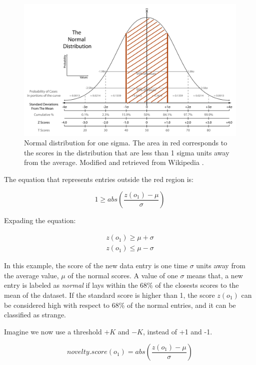 \begin{figure}[h]
\includegraphics[width=15cm]{Figures/Normal_d_sigma}
\centering
\caption[Normal distribution for one sigma]{Normal distribution for one sigma. The area in red corresponds to the scores in the distribution that are less than 1 sigma units away from the average. Modified and retrieved from Wikipedia \cite{standard}. \label{fig:normal_sig}}
\end{figure}

The equation that represents entries outside the red region is:

\begin{equation}
1 \geq abs( \dfrac{z(o_1) - \mu}{ \sigma} )
\end{equation}

Expading the equation:

\begin{equation}
\begin{split}
z(o_1) \geq \mu +\sigma \\
z(o_1) \leq \mu -\sigma
\end{split}
\end{equation}

In this example, the score of the new data entry is one time $\sigma$ units away from the average value, $\mu$ of the normal scores. A value of one $\sigma$ means that, a new entry is labeled as \emph{normal} if lays within the 68\% of the closests scores to the mean of the dataset. If the standard score is higher than 1, the score $z(o_1)$ can be considered high with respect to 68\% of the normal entries, and it can be classified as strange. 

Imagine we now use a threshold $+K$ and $-K$, instead of +1 and -1. 

\begin{equation}
novelty.score(o_1) = abs( \dfrac{z(o_1) - \mu}{ \sigma})
\end{equation}

